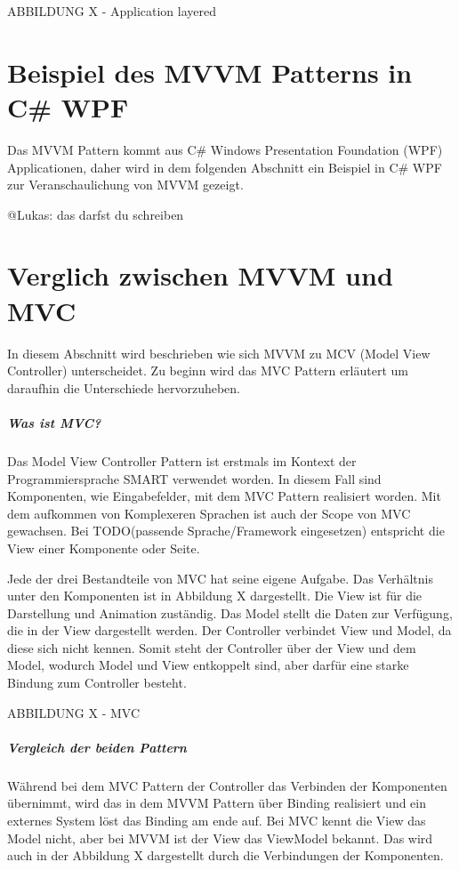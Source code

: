 \documentclass[titlepage=false,12pt]{scrreprt}
\begin{document}
ABBILDUNG X - Application layered

\chapter{Beispiel des MVVM Patterns in C\# WPF}

Das MVVM Pattern kommt aus C\# Windows Presentation Foundation (WPF) Applicationen, daher
wird in dem folgenden Abschnitt ein Beispiel in C\# WPF zur Veranschaulichung von MVVM gezeigt.


@Lukas: das darfst du schreiben

\chapter{Verglich zwischen MVVM und MVC}

In diesem Abschnitt wird beschrieben wie sich MVVM zu MCV (Model View Controller) unterscheidet. 
Zu beginn wird das MVC Pattern erläutert um daraufhin die Unterschiede hervorzuheben. 

\paragraph{Was ist MVC?}

Das Model View Controller Pattern ist erstmals im Kontext der Programmiersprache SMART verwendet 
worden. In diesem Fall sind Komponenten, wie Eingabefelder, mit dem MVC Pattern realisiert worden.
Mit dem aufkommen von Komplexeren Sprachen ist auch der Scope von MVC gewachsen. Bei TODO(passende Sprache/Framework eingesetzen)
entspricht die View einer Komponente oder Seite.

Jede der drei Bestandteile von MVC hat seine eigene Aufgabe. Das Verhältnis unter den Komponenten
ist in Abbildung X dargestellt. Die View ist für die Darstellung und
Animation zuständig. Das Model stellt die Daten zur Verfügung, die in der View dargestellt werden.
Der Controller verbindet View und Model, da diese sich nicht kennen. Somit steht der Controller 
über der View und dem Model, wodurch Model und View entkoppelt sind, aber darfür eine starke Bindung
zum Controller besteht. 

ABBILDUNG X - MVC

\paragraph{Vergleich der beiden Pattern}

Während bei dem MVC Pattern der Controller das Verbinden der Komponenten übernimmt, wird das
in dem MVVM Pattern über Binding realisiert und ein externes System löst das Binding am ende auf.
Bei MVC kennt die View das Model nicht, aber bei MVVM ist der View das ViewModel bekannt.
Das wird auch in der Abbildung X dargestellt durch die Verbindungen der Komponenten.
\end{document}
